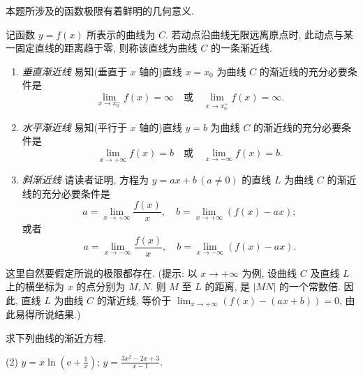 \begin{exercise}[1.3.14]
    本题所涉及的函数极限有着鲜明的几何意义.

    记函数 $y=f(x)$ 所表示的曲线为 $C$. 若动点沿曲线无限远离原点时, 此动点与某一固定直线的距离趋于零, 则称该直线为曲线 $C$ 的一条渐近线.
    \begin{enumerate}[label=(\roman*)]
        \item \textit{垂直渐近线} \quad 易知(垂直于 $x$ 轴的)直线 $x=x_0$ 为曲线 $C$ 的渐近线的充分必要条件是
              $$ \lim_{x \to x_0^-} f(x) = \infty \quad \text{或} \quad \lim_{x \to x_0^+} f(x) = \infty. $$

        \item \textit{水平渐近线} \quad 易知(平行于 $x$ 轴的)直线 $y=b$ 为曲线 $C$ 的渐近线的充分必要条件是
              $$ \lim_{x \to +\infty} f(x) = b \quad \text{或} \quad \lim_{x \to -\infty} f(x) = b. $$

        \item \textit{斜渐近线} \quad 请读者证明, 方程为 $y=ax+b \, (a \ne 0)$ 的直线 $L$ 为曲线 $C$ 的渐近线的充分必要条件是
              $$ a = \lim_{x \to +\infty} \frac{f(x)}{x}, \quad b = \lim_{x \to +\infty} (f(x)-ax); $$
              或者
              $$ a = \lim_{x \to -\infty} \frac{f(x)}{x}, \quad b = \lim_{x \to -\infty} (f(x)-ax). $$
    \end{enumerate}
    这里自然要假定所说的极限都存在. (提示: 以 $x \to +\infty$ 为例, 设曲线 $C$ 及直线 $L$ 上的横坐标为 $x$ 的点分别为 $M,N$. 则 $M$ 至 $L$ 的距离, 是 $|MN|$ 的一个常数倍. 因此, 直线 $L$ 为曲线 $C$ 的渐近线, 等价于 $\lim_{x \to +\infty} (f(x) - (ax+b)) = 0$, 由此易得所说结果.)

    求下列曲线的渐近方程.
    \begin{tasks}[label=(\arabic*)](2)
        \task $y=x\ln\left(\mathrm{e} + \frac{1}{x}\right)$;
        \task $y=\frac{3x^2-2x+3}{x-1}$.
    \end{tasks}
\end{exercise}

